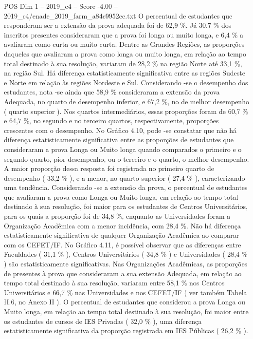 \begin{textsample}{POS Dim 1 – 2019\_c4 – Score -4.00 – 2019\_c4/enade\_2019\_farm\_a84c9952ee.txt}
O percentual de estudantes que responderam ser a extensão da prova adequada foi de 62,9 \%.
Já 30,7 \% dos inscritos presentes consideraram que a prova foi longa ou muito longa, e 6,4 \% a avaliaram como curta ou muito curta.
Dentre as Grandes Regiões, as proporções daqueles que avaliaram a prova como longa ou muito longa, em relação ao tempo total destinado à sua resolução, variaram de 28,2 \% na região Norte até 33,1 \%, na região Sul.
Há diferença estatisticamente significativa entre as regiões Sudeste e Norte em relação às regiões Nordeste e Sul.
Considerando -se o desempenho dos estudantes, nota -se ainda que 58,9 \% consideraram a extensão da prova Adequada, no quarto de desempenho inferior, e 67,2 \%, no de melhor desempenho ( quarto superior ).
Nos quartos intermediários, essas proporções foram de 60,7 \% e 64,7 \%, no segundo e no terceiro quartos, respectivamente, proporções crescentes com o desempenho.
No Gráfico 4.10, pode -se constatar que não há diferença estatisticamente significativa entre as proporções de estudantes que consideraram a prova Longa ou Muito longa quando comparados o primeiro e o segundo quarto, pior desempenho, ou o terceiro e o quarto, o melhor desempenho.
A maior proporção dessa resposta foi registrada no primeiro quarto de desempenho ( 33,2 \% ), e a menor, no quarto superior ( 27,4 \% ), caracterizando uma tendência.
Considerando -se a extensão da prova, o percentual de estudantes que avaliaram a prova como Longa ou Muito longa, em relação ao tempo total destinado à sua resolução, foi maior para os estudantes de Centros Universitários, para os quais a proporção foi de 34,8 \%, enquanto as Universidades foram a Organização Acadêmica com a menor incidência, com 28,4 \%.
Não há diferença estatisticamente significativa de qualquer Organização Acadêmica ao comparar com os CEFET/IF.
No Gráfico 4.11, é possível observar que as diferenças entre Faculdades ( 31,1 \% ), Centros Universitários ( 34,8 \% ) e Universidades ( 28,4 \% ) são estatisticamente significativas.
Nas Organizações Acadêmicas, as proporções de presentes à prova que consideraram a sua extensão Adequada, em relação ao tempo total destinado à sua resolução, variaram entre 58,1 \% nos Centros Universitários e 66,7 \% nas Universidades e nos CEFET/IF ( ver também Tabela II.6, no Anexo II ).
O percentual de estudantes que considerou a prova Longa ou Muito longa, em relação ao tempo total destinado à sua resolução, foi maior entre os estudantes de cursos de IES Privadas ( 32,0 \% ), uma diferença estatisticamente significativa da proporção registrada em IES Públicas ( 26,2 \% ).

\end{textsample}
